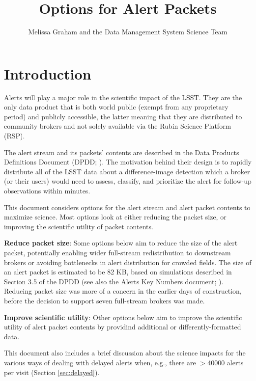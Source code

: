 \documentclass[DM,authoryear,toc]{lsstdoc}
\title{Options for Alert Packets}
\author{%
Melissa Graham and the Data Management System Science Team
}
\date{\vcsDate}
\begin{document}
\maketitle


\section{Introduction}\label{sec:introduction}

Alerts will play a major role in the scientific impact of the LSST.
They are the only data product that is both world public (exempt from any proprietary period) and publicly accessible,
the latter meaning that they are distributed to community brokers and not solely available via the Rubin Science Platform (RSP).

The alert stream and its packets' contents are described in the Data Products Definitions Document (DPDD; ).
The motivation behind their design is to rapidly distribute all of the LSST data about a difference-image detection which a broker (or their users) would need to assess, classify, and prioritize the alert for follow-up observations within minutes.

This document considers options for the alert stream and alert packet contents to maximize science.
Most options look at either reducing the packet size, or improving the scientific utility of packet contents.

\textbf{Reduce packet size}:
Some options below aim to reduce the size of the alert packet, potentially enabling wider full-stream redistribution to downstream brokers or avoiding bottlenecks in alert distribution for crowded fields.
The size of an alert packet is estimated to be 82 KB, based on simulations described in Section 3.5 of the DPDD (see also the Alerts Key Numbers document; ).
Reducing packet size was more of a concern in the earlier days of construction, before the decision to support seven full-stream brokers was made.

\textbf{Improve scientific utility}:
Other options below aim to improve the scientific utility of alert packet contents by providind additional or differently-formatted data.

This document also includes a brief discussion about the science impacts for the various ways of dealing with delayed alerts when, e.g., there are $>$40000 alerts per visit (Section \ref{sec:delayed}).
\end{document}
